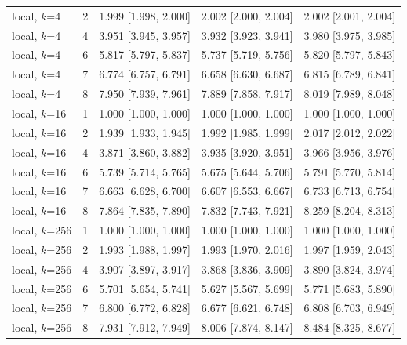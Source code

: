 {\begin{longtable}{llccc}
local, $k$=4 & 2 & 1.999 [1.998, 2.000] & 2.002 [2.000, 2.004] & 2.002 [2.001, 2.004] \\
local, $k$=4 & 4 & 3.951 [3.945, 3.957] & 3.932 [3.923, 3.941] & 3.980 [3.975, 3.985] \\
local, $k$=4 & 6 & 5.817 [5.797, 5.837] & 5.737 [5.719, 5.756] & 5.820 [5.797, 5.843] \\
local, $k$=4 & 7 & 6.774 [6.757, 6.791] & 6.658 [6.630, 6.687] & 6.815 [6.789, 6.841] \\
local, $k$=4 & 8 & 7.950 [7.939, 7.961] & 7.889 [7.858, 7.917] & 8.019 [7.989, 8.048] \\
\midrule
local, $k$=16 & 1 & 1.000 [1.000, 1.000] & 1.000 [1.000, 1.000] & 1.000 [1.000, 1.000] \\
local, $k$=16 & 2 & 1.939 [1.933, 1.945] & 1.992 [1.985, 1.999] & 2.017 [2.012, 2.022] \\
local, $k$=16 & 4 & 3.871 [3.860, 3.882] & 3.935 [3.920, 3.951] & 3.966 [3.956, 3.976] \\
local, $k$=16 & 6 & 5.739 [5.714, 5.765] & 5.675 [5.644, 5.706] & 5.791 [5.770, 5.814] \\
local, $k$=16 & 7 & 6.663 [6.628, 6.700] & 6.607 [6.553, 6.667] & 6.733 [6.713, 6.754] \\
local, $k$=16 & 8 & 7.864 [7.835, 7.890] & 7.832 [7.743, 7.921] & 8.259 [8.204, 8.313] \\
\midrule
local, $k$=256 & 1 & 1.000 [1.000, 1.000] & 1.000 [1.000, 1.000] & 1.000 [1.000, 1.000] \\
local, $k$=256 & 2 & 1.993 [1.988, 1.997] & 1.993 [1.970, 2.016] & 1.997 [1.959, 2.043] \\
local, $k$=256 & 4 & 3.907 [3.897, 3.917] & 3.868 [3.836, 3.909] & 3.890 [3.824, 3.974] \\
local, $k$=256 & 6 & 5.701 [5.654, 5.741] & 5.627 [5.567, 5.699] & 5.771 [5.683, 5.890] \\
local, $k$=256 & 7 & 6.800 [6.772, 6.828] & 6.677 [6.621, 6.748] & 6.808 [6.703, 6.949] \\
local, $k$=256 & 8 & 7.931 [7.912, 7.949] & 8.006 [7.874, 8.147] & 8.484 [8.325, 8.677] \\
\end{longtable}
}

